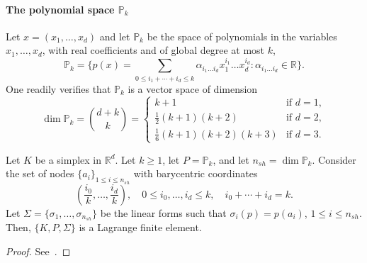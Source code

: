 
\paragraph{\texorpdfstring{The polynomial space $\mathbb{P}_k$}{The polynomial space Pk}} Let $x = (x_1, \dots, x_d)$ and let $\mathbb{P}_k$ be the space of polynomials in the variables $x_1, \dots, x_d$, with real coefficients and of global degree at most $k$,
\begin{equation}
    \mathbb{P}_k = \{ p(x) = \sum_{0 \le i_1 + \cdots + i_d \le k} \alpha_{i_1 \dots i_d} x_1^{i_1} \dots x_d^{i_d} : \alpha_{i_1 \dots i_d} \in \mathbb{R} \}.
\end{equation}
One readily verifies that $\mathbb{P}_k$ is a vector space of dimension
\begin{equation*}
    \dim \mathbb{P}_k = \binom{d+k}{k} = \begin{cases} k+1 & \text{if } d=1, \\ \frac{1}{2}(k+1)(k+2) & \text{if } d=2, \\ \frac{1}{6}(k+1)(k+2)(k+3) & \text{if } d=3. \end{cases}
\end{equation*}
\begin{lemma}\label{lemma:simplicial_lagrange_fe}
    Let $K$ be a simplex in $\mathbb{R}^d$. Let $k \ge 1$, let $P = \mathbb{P}_k$, and let $n_{sh} = \dim \mathbb{P}_k$. Consider the set of nodes $\{a_i\}_{1 \le i \le n_{sh}}$ with barycentric coordinates
    \begin{equation*}
        \left(\frac{i_0}{k}, \dots, \frac{i_d}{k}\right), \quad 0 \le i_0, \dots, i_d \le k, \quad i_0 + \cdots + i_d = k.
    \end{equation*}
    Let $\Sigma = \{\sigma_1, \dots, \sigma_{n_{sh}}\}$ be the linear forms such that $\sigma_i(p) = p(a_i)$, $1 \le i \le n_{sh}$. Then, $\{K, P, \Sigma\}$ is a Lagrange finite element.
    \begin{proof}
        See~\cite[Exercise 1.3]{ern2004theory}.
    \end{proof}
\end{lemma}

